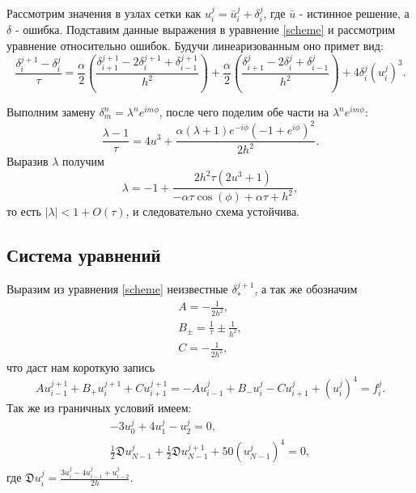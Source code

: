 \documentclass[a4paper,12pt]{article}
\begin{document}
Рассмотрим значения в узлах сетки как \(u_{i}^{j} = \bar{u}_{i}^{j} + \delta_{i}^{j}\), где \(\bar{u}\) - истинное решение, а \(\delta\) - ошибка. Подставим данные выражения в уравнение \cref{scheme} и рассмотрим уравнение относительно ошибок. Будучи линеаризованным оно примет вид:
\begin{equation*}
  \frac{\delta_{i}^{j+1}-\delta_{i}^{j}}{\tau}=\frac{\alpha}{2}\left(\frac{\delta_{i+1}^{j+1}-2\delta_{i}^{j+1}+\delta_{i-1}^{j+1}}{h^2}\right) + \frac{\alpha}{2}\left(\frac{\delta_{i+1}^{j}-2\delta_{i}^{j}+\delta_{i-1}^{j}}{h^2}\right) + 4\delta_{i}^{j} \left(u_{i}^{j}\right)^3.
\end{equation*}

Выполним замену \(\delta_{m}^{n}=\lambda^{n} e^{i m \phi}\), после чего поделим обе части на \(\lambda^{n} e^{i m \phi}\):
\begin{equation*}
  \frac{\lambda -1}{\tau }=4 u^3+\frac{\alpha  (\lambda +1) e^{-i \phi } \left(-1+e^{i \phi }\right)^2}{2 h^2}.
\end{equation*}
Выразив \(\lambda\) получим
\begin{equation*}
  \lambda = -1 + \frac{2 h^2 \tau \left(2 u^3+1\right)}{-\alpha  \tau  \cos (\phi )+\alpha  \tau +h^2},
\end{equation*}
то есть \(\left|\lambda\right| < 1 + O(\tau)\), и следовательно схема устойчива.

\subsection*{Система уравнений}

Выразим из уравнения \cref{scheme} неизвестные \(\delta_{*}^{j+1}\), а так же обозначим
\begin{gather*}
  A = -\frac{1}{2h^2},\\
  B_{\pm} = \frac{1}{\tau}\pm\frac{1}{h^2},\\
  C = -\frac{1}{2h^2},
\end{gather*}
что даст нам короткую запись
\begin{equation}\label{eq}
  A u_{i-1}^{j+1} + B_{+} u_{i}^{j+1} + C u_{i+1}^{j+1} = -A u_{i-1}^{j} + B_{-} u_{i}^{j} - C u_{i+1}^{j} + \left(u_{i}^{j}\right)^4 = f_{i}^{j}.
\end{equation}
Так же из граничных условий имеем:
\begin{gather}
  \label{lcond}-3 u_{0}^{j} + 4u_{1}^{j}-u_{2}^{j}=0,\\
  \label{rcond}\frac{1}{2}\mathfrak{D} u_{N-1}^{j} + \frac{1}{2}\mathfrak{D} u_{N-1}^{j+1} + 50\left(u_{N-1}^{j}\right)^4=0,
\end{gather}
где \(\mathfrak{D} u_{i}^{j}=\frac{3 u_{i}^{j} - 4u_{i-1}^{j}+u_{i-2}^{j}}{2h}\).
\end{document}
